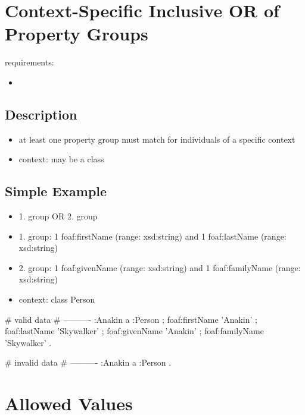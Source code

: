 \documentclass{llncs}
\begin{document}
\section{Context-Specific Inclusive OR of Property Groups}

requirements:

\begin{itemize}
	\item 
\end{itemize}

\subsection{Description}

\begin{itemize}
  \item at least one property group must match for individuals of a specific context 
	\item context: may be a class
\end{itemize}

\subsection{Simple Example}

\begin{itemize}
  \item 1. group OR 2. group
	\item 1. group: 1 foaf:firstName (range: xsd:string) and 1 foaf:lastName (range: xsd:string)
	\item 2. group: 1 foaf:givenName (range: xsd:string) and 1 foaf:familyName (range: xsd:string)
	\item context: class Person
\end{itemize}

\begin{ex}
# valid data
# ----------
:Anakin
    a :Person ;
    foaf:firstName 'Anakin' ;
    foaf:lastName 'Skywalker' ;
    foaf:givenName 'Anakin' ;
    foaf:familyName 'Skywalker' .
\end{ex}

\begin{ex}
# invalid data
# ----------
:Anakin
    a :Person .
\end{ex}

\section{Allowed Values}
\end{document}

